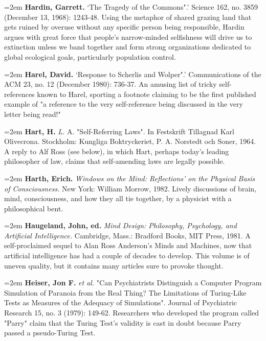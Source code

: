 \par\noindent\hangindent=2em {\bf Hardin, Garrett.} `The Tragedy of the Commons".' Science 162, no. 3859 (December 13, 1968): 1243-48. Using the metaphor of shared grazing land that gets ruined by overuse without any specific person being responsible, Hardin argues with great force that people's narrow-minded selfishness will drive us to extinction unless we band together and form strong organizations dedicated to global ecological goals, particularly population control.

\par\noindent\hangindent=2em {\bf Harel, David.} `Response to Scherlis and Wolper".' Communications of the ACM 23, no. 12 (December 1980): 736-37. An amusing list of tricky self-references known to Harel, sporting a footnote claiming to be the first published example of "a reference to the very self-reference being discussed in the very letter being read!"

\par\noindent\hangindent=2em {\bf Hart, H.} {\it L.} A. "Self-Referring Laws". In Festskrift Tillagnad Karl Olivecrona. Stockholm: Kungliga Boktryckeriet, P. A. Norstedt och Soner, 1964. A reply to Alf Ross (see below), in which Hart, perhaps today's leading philosopher of law, claims that self-amending laws are legally possible.

\par\noindent\hangindent=2em {\bf Harth, Erich.} {\it Windows on the Mind: Reflections' on the Physical Basis of Consciousness.} New York: William Morrow, 1982. Lively discussions of brain, mind, consciousness, and how they all tie together, by a physicist with a philosophical bent.

\par\noindent\hangindent=2em {\bf Haugeland, John, ed.} {\it Mind Design: Philosophy, Psychology, and Artificial Intelligence.} Cambridge, Mass.: Bradford Books, MIT Press, 1981. A self-proclaimed sequel to Alan Ross Anderson's Minds and Machines, now that artificial intelligence has had a couple of decades to develop. This volume is of uneven quality, but it contains many articles sure to provoke thought.

\par\noindent\hangindent=2em {\bf Heiser, Jon F.} {\it et al.} "Can Psychiatrists Distinguish a Computer Program Simulation of Paranoia from the Real Thing? The Limitations of Turing-Like Tests as Measures of the Adequacy of Simulations". Journal of Psychiatric Research 15, no. 3 (1979): 149-62. Researchers who developed the program called "Parry" claim that the Turing Test's validity is cast in doubt because Parry passed a pseudo-Turing Test.

